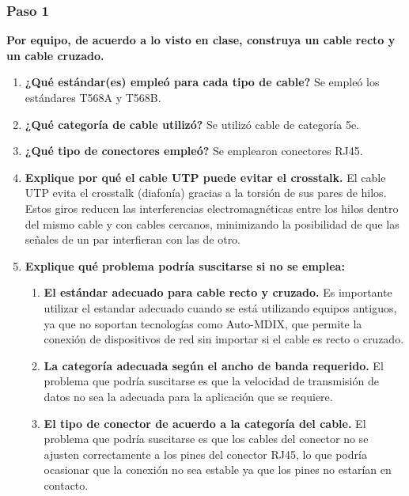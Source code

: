         \subsubsection*{Paso 1}
        \textbf{Por equipo, de acuerdo a lo visto en clase, construya un cable recto y un cable cruzado.}
        \begin{enumerate}
            \item \textbf{¿Qué estándar(es) empleó para cada tipo de cable?}
            Se empleó los estándares T568A y T568B.
            \item \textbf{¿Qué categoría de cable utilizó?}
            Se utilizó cable de categoría 5e.
            \item \textbf{¿Qué tipo de conectores empleó?}
            Se emplearon conectores RJ45.
            \item \textbf{Explique por qué el cable UTP puede evitar el crosstalk.}
            El cable UTP evita el crosstalk (diafonía) gracias a la torsión de sus pares de hilos. Estos giros reducen las interferencias electromagnéticas entre los hilos dentro del mismo cable y con cables cercanos, minimizando la posibilidad de que las señales de un par interfieran con las de otro.
            \item \textbf{Explique qué problema podría suscitarse si no se emplea:}
            \begin{enumerate}
                \item \textbf{El estándar adecuado para cable recto y cruzado.}
                Es importante utilizar el estandar adecuado cuando se está utilizando equipos antiguos, ya que no soportan tecnologías como Auto-MDIX, que permite la conexión de dispositivos de red sin importar si el cable es recto o cruzado.
                \item \textbf{La categoría adecuada según el ancho de banda requerido.}
                El problema que podría suscitarse es que la velocidad de transmisión de datos no sea la adecuada para la aplicación que se requiere.
                \item \textbf{El tipo de conector de acuerdo a la categoría del cable.}
                El problema que podría suscitarse es que los cables del conector no se ajusten correctamente a los pines del conector RJ45, lo que podría ocasionar que la conexión no sea estable ya que los pines no estarían en contacto.
            \end{enumerate}
        \end{enumerate}

